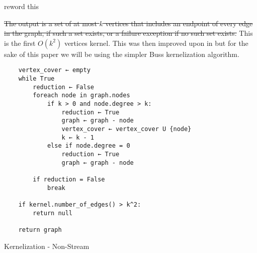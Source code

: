 reword this

\sout{The output is a set of at most \(k\) vertices that includes an endpoint
    of every edge in the graph, if such a set exists, or a failure exception if
    no such set exists.} This is the first \(O(k^2)\) vertices kernel. This was
then improved upon in \cite{balasubramanian1998improved} but for the sake
of this paper we will be using the simpler Buss kernelization algorithm.

\begin{verbatim}
    vertex_cover ← empty
    while True
        reduction ← False
        foreach node in graph.nodes
            if k > 0 and node.degree > k:
                reduction ← True
                graph ← graph - node
                vertex_cover ← vertex_cover U {node}
                k ← k - 1
            else if node.degree = 0
                reduction ← True
                graph ← graph - node

        if reduction = False
            break

    if kernel.number_of_edges() > k^2:
        return null

    return graph
\end{verbatim}

\begin{algorithm}[H]
    \caption{Kernelization - Non-Stream}
    \DontPrintSemicolon

\end{algorithm}


